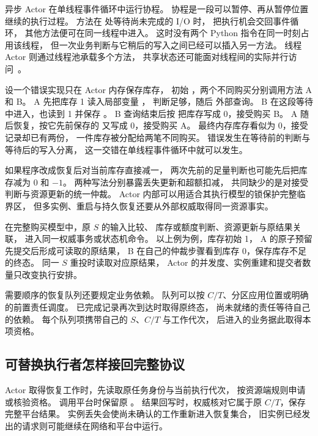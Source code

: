 异步 Actor 在单线程事件循环中运行协程。
协程是一段可以暂停、再从暂停位置继续的执行过程。
方法在  处等待尚未完成的 I/O 时，
把执行机会交回事件循环，
其他方法便可在同一线程中进入。
这时没有两个 Python 指令在同一时刻占用该线程，
但一次业务判断与它稍后的写入之间已经可以插入另一方法。
线程 Actor 则通过线程池承载多个方法，
共享状态还可能面对线程间的实际并行访问~\cite{ray259-actor-async}。

设一个错误实现只在 Actor 内存保存库存，
初始 ，两个不同购买分别调用方法 A 和 B。
A 先把库存 1 读入局部变量 ，
判断足够，随后  外部查询。
B 在这段等待中进入，也读到 1 并保存 。
B 查询结束后按  把库存写成 0，接受购买 B。
A 随后恢复，按它先前保存的  又写成 0，接受购买 A。
最终内存库存看似为 0，接受记录却已有两份，
一件库存被分配给两笔不同购买。
错误发生在等待前的判断与等待后的写入分离，
这一交错在单线程事件循环中就可以发生。


如果程序改成恢复后对当前库存直接减一，
两次先前的足量判断也可能先后把库存减为 0 和 $-1$。
两种写法分别暴露丢失更新和超额扣减，
共同缺少的是对接受判断与资源更新的统一仲裁。
Actor 内部可以用适合其执行模型的锁保护完整临界区，
但多实例、重启与持久恢复还要从外部权威取得同一资源事实。


在完整购买模型中，原 $S$ 的输入比较、
库存或额度判断、资源更新与原结果关联，
进入同一权威事务或状态机命令。
以上例为例，库存初始 1，
A 的原子预留先提交后形成可读取的原结果，
B 在自己的仲裁步骤看到库存 0，保存库存不足的终态。
同一 $S$ 重投时读取对应原结果，
Actor 的并发度、实例重建和提交者数量只改变执行安排。

需要顺序的恢复队列还要规定业务依赖。
队列可以按 $C/T$、分区应用位置或明确的前置责任调度。
已完成记录再次到达时取得原终态，
尚未就绪的责任等待自己的依赖。
每个队列项携带自己的 $S$、$C/T$ 与工作代次，
后进入的业务据此取得本项资格。

\subsection{可替换执行者怎样接回完整协议}

Actor 取得恢复工作时，先读取原任务身份与当前执行代次，
按资源端规则申请或核验资格。
调用平台时保留原 。
结果回写时，权威核对它属于原 $C/T$，保存完整平台结果。
实例丢失会使尚未确认的工作重新进入恢复集合，
旧实例已经发出的请求则可能继续在网络和平台中运行。

